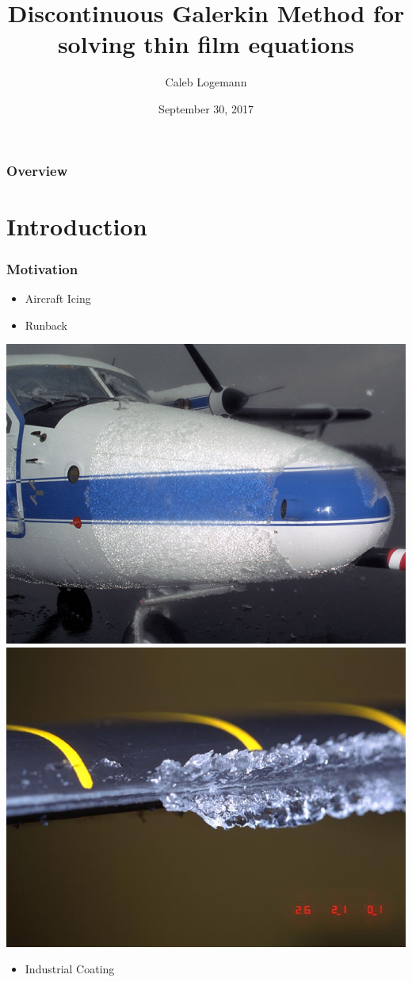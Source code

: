 \documentclass[10pt]{beamer}
\title[]{Discontinuous Galerkin Method for solving thin film equations} %
\author{Caleb Logemann} %
\institute[Iowa State University]{%
Mathematics Department, Iowa State University \\ %
\medskip
\textit{logemann@iastate.edu}} %
\date{September 30, 2017} %
\begin{document}
  \begin{frame}
    \titlepage{}
  \end{frame}

  \begin{frame}
    \frametitle{Overview}
    \tableofcontents
  \end{frame}

  \section{Introduction}
    \begin{frame}
      \frametitle{Motivation}
      \begin{itemize}
        \item Aircraft Icing
        \item Runback
      \end{itemize}
      \begin{center}
        \includegraphics[scale=0.2]{Figures/Icing_on_a_plane.jpg}
        \hspace{0.1in}
        \includegraphics[scale=0.2]{Figures/Icing_on_a_rotor.jpg}
      \end{center}
      \begin{itemize}
        \item Industrial Coating
      \end{itemize}
    \end{frame}
\end{document}
